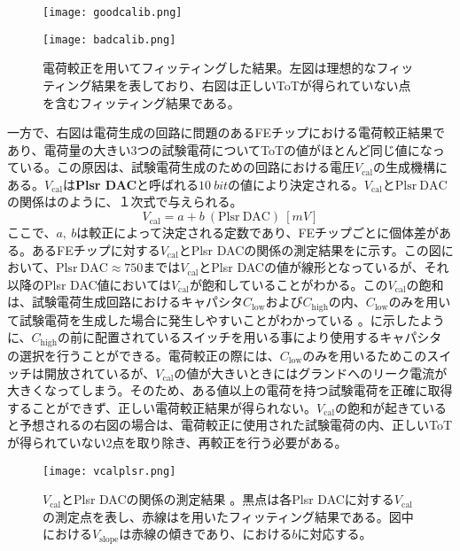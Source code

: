 \begin{figure}[tbp]
  \begin{minipage}[b]{0.5\linewidth}
    \centering
    \texttt{[image: goodcalib.png]}
  \end{minipage}
  \begin{minipage}[b]{0.5\linewidth}
    \centering
    \texttt{[image: badcalib.png]}
  \end{minipage}
  \caption[電荷較正を用いてフィッティングした結果]{電荷較正を用いてフィッティングした結果。左図は理想的なフィッティング結果を表しており、右図は正しいToTが得られていない点を含むフィッティング結果である。}
  \label{fig:calibhikaku}
\end{figure}

一方で、右図は電荷生成の回路に問題のあるFEチップにおける電荷較正結果であり、電荷量の大きい3つの試験電荷についてToTの値がほとんど同じ値になっている。この原因は、試験電荷生成のための回路における電圧$V_\mathrm{cal}$の生成機構にある。$V_\mathrm{cal}$は\textbf{Plsr DAC}と呼ばれる$10\ \si{bit}$の値により決定される。$V_\mathrm{cal}$と$\mathrm{Plsr\ DAC}$の関係はのように、１次式で与えられる。
\begin{equation}
  \label{eq:vcal}
  V_\mathrm{cal} = a + b\ (\mathrm{Plsr\ DAC})\ [\si{mV}]
\end{equation}
ここで、$a,\ b$は較正によって決定される定数であり、FEチップごとに個体差がある。あるFEチップに対する$V_\mathrm{cal}$とPlsr DACの関係の測定結果をに示す。この図において、$\mathrm{Plsr\ DAC}\approx 750$までは$V_\mathrm{cal}$とPlsr DACの値が線形となっているが、それ以降のPlsr DAC値においては$V_\mathrm{cal}$が飽和していることがわかる。この$V_\mathrm{cal}$の飽和は、試験電荷生成回路におけるキャパシタ$C_\mathrm{low}$および$C_\mathrm{high}$の内、$C_\mathrm{low}$のみを用いて試験電荷を生成した場合に発生しやすいことがわかっている \cite{houwa}。に示したように、$C_\mathrm{high}$の前に配置されているスイッチを用いる事により使用するキャパシタの選択を行うことができる。電荷較正の際には、$C_\mathrm{low}$のみを用いるためこのスイッチは開放されているが、$V_\mathrm{cal}$の値が大きいときにはグランドへのリーク電流が大きくなってしまう。そのため、ある値以上の電荷を持つ試験電荷を正確に取得することができず、正しい電荷較正結果が得られない。$V_\mathrm{cal}$の飽和が起きていると予想されるの右図の場合は、電荷較正に使用された試験電荷の内、正しいToTが得られていない2点を取り除き、再較正を行う必要がある。
\begin{figure}[tbp]
  \centering
  \texttt{[image: vcalplsr.png]}
  \caption[$V_\mathrm{cal}$とPlsr DACの関係の測定結果]{$V_\mathrm{cal}$とPlsr DACの関係の測定結果 \cite{vcal}。黒点は各Plsr DACに対する$V_\mathrm{cal}$の測定点を表し、赤線はを用いたフィッティング結果である。図中における$V_\mathrm{slope}$は赤線の傾きであり、における$b$に対応する。}
  \label{fig:vcalplot}
\end{figure}

